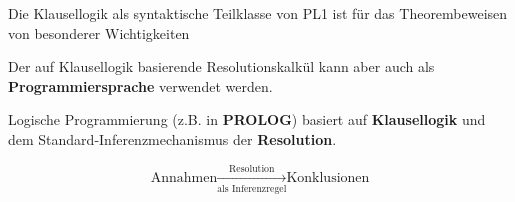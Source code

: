 \documentclass[runningheads]{llncs}
\begin{document}
Die Klausellogik als syntaktische Teilklasse von PL1 ist für das Theorembeweisen von besonderer Wichtigkeiten

Der auf Klausellogik basierende Resolutionskalkül kann aber auch als \textbf{Programmiersprache} verwendet werden.

Logische Programmierung (z.B. in \textbf{PROLOG}) basiert auf \textbf{Klausellogik} und dem Standard-Inferenzmechanismus der \textbf{Resolution}.

\[
    \text{Annahmen} \xrightarrow[\text{als Inferenzregel}]{\text{Resolution}} \text{Konklusionen}
\]

\end{document}
